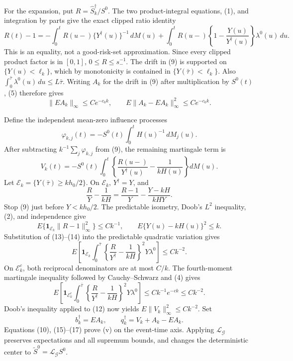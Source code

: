 For the expansion, put \(R=\widehat S_k^\dagger/S^0\).  The two
product-integral equations, (1), and integration by parts give the exact clipped
ratio identity
\[
 R(t)-1
 =-\int_0^tR(u-)\{Y^\dagger(u)\}^{-1}\,dM(u)
  +\int_0^tR(u-)\left\{1-\frac{Y(u)}{Y^\dagger(u)}\right\}
             \lambda^0(u)\,du.                            \tag{9}
\]
This is an equality, not a good-risk-set approximation.  Since every clipped
product factor is in \([0,1]\), \(0\leq R\leq s_-^{-1}\).  The drift in
(9) is supported on \(\{Y(u)<\ell_k\}\), which by monotonicity is contained
in \(\{Y(\bar\tau)<\ell_k\}\).  Also
\(\int_0^{\bar\tau}\lambda^0(u)\,du\leq L\bar\tau\).
Writing \(A_k\) for the drift in (9) after multiplication by \(S^0(t)\),
(5) therefore gives
\[
 \|EA_k\|_\infty\leq Ce^{-c_0k},\qquad
 E\|A_k-EA_k\|_\infty^2\leq Ce^{-c_0k}.                 \tag{10}
\]

Define the independent mean-zero influence processes
\[
 \varphi_{k,j}(t)
 =-S^0(t)\int_0^tH(u)^{-1}\,dM_j(u).                      \tag{11}
\]
After subtracting \(k^{-1}\sum_j\varphi_{k,j}\) from (9), the remaining
martingale term is
\[
 V_k(t)=-S^0(t)\int_0^t
 \left\{\frac{R(u-)}{Y^\dagger(u)}-\frac{1}{kH(u)}\right\}
 dM(u).                                                     \tag{12}
\]
Let \(\mathcal E_k=\{Y(\bar\tau)\geq kh_0/2\}\).  On
\(\mathcal E_k\), \(Y^\dagger=Y\), and
\[
 \frac{R}{Y}-\frac{1}{kH}
 =\frac{R-1}{Y}-\frac{Y-kH}{kHY}.                          \tag{13}
\]
Stop (9) just before \(Y<kh_0/2\).  The predictable isometry, Doob's
\(L^2\) inequality, (2), and independence give
\[
 E\{\mathbf 1_{\mathcal E_k}\|R-1\|_\infty^2\}\leq Ck^{-1},
 \qquad E\{Y(u)-kH(u)\}^2\leq k.                          \tag{14}
\]
Substitution of (13)--(14) into the predictable quadratic variation gives
\[
 E\left[\mathbf 1_{\mathcal E_k}\int_0^{\bar\tau}
 \left\{\frac{R}{Y^\dagger}-\frac{1}{kH}\right\}^2
 Y\lambda^0\right]\leq Ck^{-2}.                          \tag{15}
\]
On \(\mathcal E_k^c\), both reciprocal denominators are at most \(C/k\).
The fourth-moment martingale inequality followed by Cauchy--Schwarz and (4)
gives
\[
 E\left[\mathbf 1_{\mathcal E_k^c}\int_0^{\bar\tau}
 \left\{\frac{R}{Y^\dagger}-\frac{1}{kH}\right\}^2
 Y\lambda^0\right]
 \leq Ck^{-1}e^{-ck}\leq Ck^{-2}.                         \tag{16}
\]
Doob's inequality applied to (12) now yields
\(E\|V_k\|_\infty^2\leq Ck^{-2}\).  Set
\[
 b_k^\dagger=EA_k,
 \qquad q_k^\dagger=V_k+A_k-EA_k.                         \tag{17}
\]
Equations (10), (15)--(17) prove (v) on the event-time axis.  Applying
\(\mathcal L_{\mathcal G}\) preserves expectations and all supremum bounds,
and changes the deterministic center to
\(\widetilde S^0=\mathcal L_{\mathcal G}S^0\).

